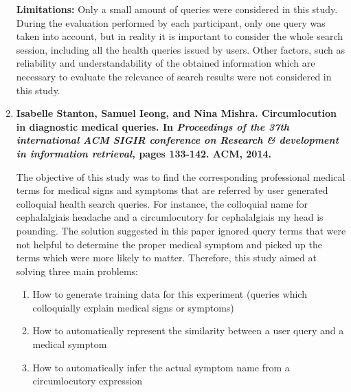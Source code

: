 \documentclass[]{article}
\begin{document}
\begin{enumerate}
\textbf{Limitations:} Only a small amount of queries were considered in this study. 
During the evaluation performed by each participant, only one query was taken into account, but in reality it is important to consider the whole search session, including all the health queries issued by users. Other factors, such as reliability and understandability of the obtained information which are necessary to evaluate the relevance of search results were not considered in this study.\\

\item {\textbf{Isabelle Stanton, Samuel Ieong, and Nina Mishra. Circumlocution in diagnostic medical queries. In \textit{Proceedings of the 37th international ACM SIGIR conference on Research \& development in information retrieval,} pages 133-142. ACM, 2014.}}

The objective of this study was to find the corresponding professional medical terms for medical signs and symptoms that are referred by user generated \textquotesingle colloquial health search queries\textquotesingle. For instance, the colloquial name for \textquotesingle cephalalgia\textquotesingle is headache and a circumlocutory for \textquotesingle cephalalgia\textquotesingle is \textquotesingle my head is pounding\textquotesingle. The solution suggested in this paper ignored query terms that were not helpful to determine the proper medical symptom and picked up the terms which were more likely to matter. Therefore, this study aimed at solving three main problems:

\begin{enumerate}
	\item How to generate training data for this experiment (queries which colloquially explain medical signs or symptoms)
	
	\item How to automatically represent the similarity between a user query and a medical symptom
	
	\item How to automatically infer the actual symptom name from a circumlocutory expression

\end{enumerate}



\end{enumerate}
\end{document}
